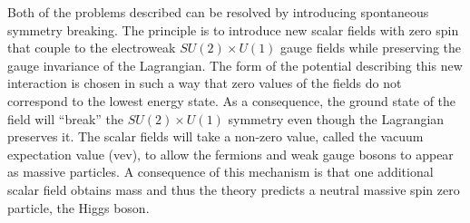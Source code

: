 Both of the problems described can be resolved by introducing 
spontaneous symmetry breaking. The principle is to introduce new scalar fields with 
zero spin that couple to the electroweak  $ SU\left(2\right) \times U\left(1\right) $
gauge fields while preserving the gauge invariance of the Lagrangian.
The form of the potential describing this new interaction is chosen in such a way that 
zero values of the fields do not correspond to the lowest energy state.
As a consequence, the ground state of the field will ``break'' the  
$ SU\left(2\right) \times U\left(1\right) $ symmetry 
even though the Lagrangian preserves it.
The scalar fields will take a non-zero value, called the vacuum expectation value 
(vev), to allow the fermions and weak gauge bosons to appear as massive particles.
A consequence of this mechanism is that one additional scalar field obtains mass
and thus the theory predicts a neutral massive spin zero particle, the Higgs boson. 

